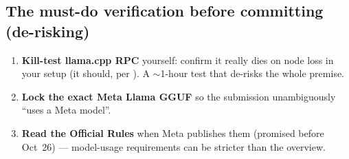 \subsection{The must-do verification before committing (de-risking)}
\begin{enumerate}[leftmargin=1.6em,nosep]
  \item \textbf{Kill-test llama.cpp RPC} yourself: confirm it really dies on
  node loss in your setup (it should, per \VER). A $\sim$1-hour test that
  de-risks the whole premise.
  \item \textbf{Lock the exact Meta Llama GGUF} so the submission unambiguously
  ``uses a Meta model''.
  \item \textbf{Read the Official Rules} when Meta publishes them (promised
  before Oct~26) --- model-usage requirements can be stricter than the overview.
\end{enumerate}
